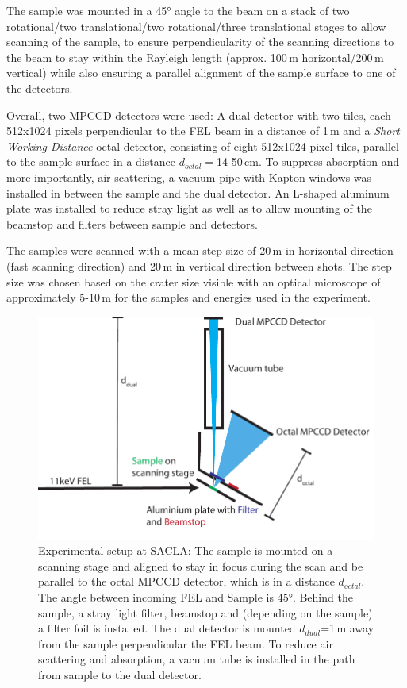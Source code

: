 The sample was mounted in a 45° angle to the beam on a stack of two rotational/two translational/two rotational/three translational stages to allow scanning of the sample, to ensure perpendicularity of the scanning directions to the beam to stay within the Rayleigh length (approx. 100\,\textmu m horizontal/200\,\textmu m vertical) while also ensuring a parallel alignment of the sample surface to one of the detectors. 

Overall, two MPCCD detectors were used: A dual detector with two tiles, each 512x1024 pixels perpendicular to the FEL beam in a distance of 1\,m and a \textit{Short Working Distance} octal detector, consisting of eight 512x1024 pixel tiles, parallel to the sample surface in a distance $d_{octal}=$14-50\,cm. To suppress absorption and more importantly, air scattering, a vacuum pipe with Kapton windows was installed in between the sample and the dual detector.
An L-shaped aluminum plate was installed to reduce stray light as well as to allow mounting of the beamstop and filters between sample and detectors.

The samples were scanned with a mean step size of 20\,\textmu m in horizontal direction (fast scanning direction) and 20\,\textmu m in vertical direction between shots. The step size was chosen based on the crater size visible with an optical microscope of approximately 5-10\,\textmu m for the samples and energies used in the experiment.

\begin{figure}
	\centering
	\includegraphics[width=0.75\linewidth]{images/setup.pdf}
	\caption[Experimental setup at SACLA]{Experimental setup at SACLA: The sample is mounted on a scanning stage and aligned to stay in focus during the scan and be parallel to the octal MPCCD detector, which is in a distance $d_{octal}$. The angle between incoming FEL and Sample is 45°. Behind the sample, a stray light filter, beamstop and (depending on the sample) a filter foil is installed. The dual detector is mounted $d_{dual}$=1\,m away from the sample perpendicular the FEL beam. To reduce air scattering and absorption, a vacuum tube is installed in the path from sample to the dual detector.}
	\label{fig:setup}
\end{figure}
